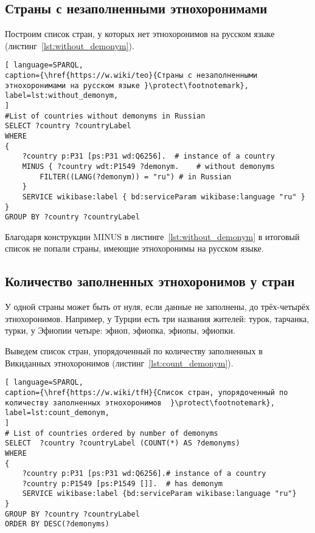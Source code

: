 
\subsection{Страны с незаполненными этнохоронимами}

Построим список стран, у которых нет этнохоронимов на русском языке (листинг~\ref{lst:without_demonym}).
\begin{lstlisting}[ language=SPARQL, 
caption={\href{https://w.wiki/teo}{Страны с незаполненными этнохоронимами на русском языке }\protect\footnotemark},
label=lst:without_demonym, 
]
#List of countries without demonyms in Russian
SELECT ?country ?countryLabel 
WHERE
{
	?country p:P31 [ps:P31 wd:Q6256].  # instance of a country
	MINUS { ?country wdt:P1549 ?demonym.    # without demonyms
		FILTER((LANG(?demonym)) = "ru") # in Russian
	}
	SERVICE wikibase:label { bd:serviceParam wikibase:language "ru" }
}
GROUP BY ?country ?countryLabel
\end{lstlisting}


Благодаря конструкции MINUS в листинге~\ref{lst:without_demonym}  в итоговый список не попали страны, имеющие этнохоронимы на русском языке. 

\subsection{Количество заполненных этнохоронимов у стран}

У одной страны может быть от нуля, если данные не заполнены, до трёх-четырёх этнохоронимов. Например, у Турции есть три названия жителей: турок, тарчанка, турки, у Эфиопии четыре: эфиоп, эфиопка, эфиопы, эфиопки.

Выведем список стран, упорядоченный по количеству заполненных в Викиданных этнохоронимов (листинг~\ref{lst:count_demonym}).

\begin{lstlisting}[ language=SPARQL, 
caption={\href{https://w.wiki/tfH}{Список стран, упорядоченный по количеству заполненных этнохоронимов  }\protect\footnotemark},
label=lst:count_demonym, 
]
# List of countries ordered by number of demonyms
SELECT  ?country ?countryLabel (COUNT(*) AS ?demonyms)
WHERE
{
	?country p:P31 [ps:P31 wd:Q6256].# instance of a country
	?country p:P1549 [ps:P1549 []].  # has demonym
	SERVICE wikibase:label {bd:serviceParam wikibase:language "ru"}
}
GROUP BY ?country ?countryLabel 
ORDER BY DESC(?demonyms)
\end{lstlisting}

